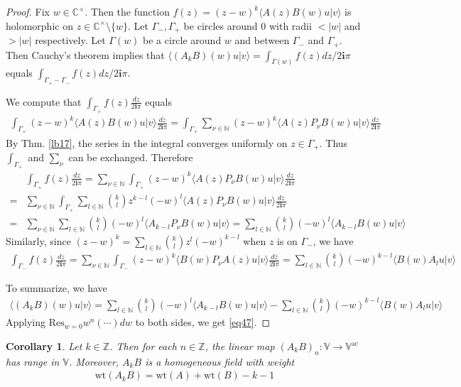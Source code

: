 \documentclass[12pt,b5paper,notitlepage]{article}
\theoremstyle{definition}
\theoremstyle{plain}
\newtheorem{co}[df]{Corollary}
\newcommand{\Res}{\mathrm{Res}}
\newcommand{\bk}[1]{\langle {#1}\rangle}
\newcommand{\im}{\mathbf{i}}
\newcommand{\Vbb}{\mathbb V}
\newcommand{\Cbb}{\mathbb C}
\newcommand{\Nbb}{\mathbb N}
\newcommand{\Zbb}{\mathbb Z}
\newcommand{\wt}{\mathrm{wt}}
\newcommand{\ac}{\mathrm{ac}}
\numberwithin{equation}{section}
\begin{document}
\begin{proof}
Fix $w\in\Cbb^\times$. Then the function $f(z)=(z-w)^k\bk{A(z)B(w)u|v}$ is holomorphic on $z\in\Cbb^\times\setminus\{w\}$. Let $\Gamma_-,\Gamma_+$ be circles around $0$ with radii $<|w|$ and $>|w|$ respectively. Let $\Gamma(w)$ be a circle around $w$ and between $\Gamma_-$ and $\Gamma_+$. Then Cauchy's theorem implies that $\bk{(A_kB)(w)u|v}=\int_{\Gamma(w)}f(z)dz/2\im\pi$ equals $\int_{\Gamma_+-\Gamma_-}f(z)dz/2\im\pi$.


We compute that $\int_{\Gamma_+}f(z)\frac{dz}{2\im\pi}$ equals
\begin{align*}
\int_{\Gamma_+}(z-w)^k\bk{A(z)B(w)u|v}\frac{dz}{2\im\pi}=\int_{\Gamma_+}\sum_{\nu\in\Nbb} (z-w)^k\bk{A(z)P_\nu B(w)u|v}\frac{dz}{2\im\pi}
\end{align*}
By Thm. \ref{lb17}, the series in the integral converges uniformly on $z\in\Gamma_+$. Thus $\int_{\Gamma_+}$ and $\sum_\nu$ can be exchanged. Therefore
\begin{align*}
&\int_{\Gamma_+}f(z)\frac{dz}{2\im\pi}=\sum_{\nu\in\Nbb}\int_{\Gamma_+} (z-w)^k\bk{A(z)P_\nu B(w)u|v}\frac{dz}{2\im\pi}\\
=&\sum_{\nu\in\Nbb}\int_{\Gamma_+}\sum_{l\in\Nbb}{k\choose l}z^{k-l}(-w)^l \bk{A(z)P_\nu B(w)u|v}\frac{dz}{2\im\pi}\\
=&\sum_{\nu\in\Nbb}\sum_{l\in\Nbb}{k\choose l}(-w)^l\bk{A_{k-l}P_\nu B(w)u|v}=\sum_{l\in\Nbb}{k\choose l}(-w)^l\bk{A_{k-l} B(w)u|v}
\end{align*}
Similarly, since $(z-w)^k=\sum_{l\in\Nbb}{k\choose l}z^l(-w)^{k-l}$ when $z$ is on $\Gamma_-$, we have
\begin{align*}
\int_{\Gamma_-}f(z)\frac{dz}{2\im\pi}=\sum_{\nu\in\Nbb}\int_{\Gamma_-} (z-w)^k\bk{B(w)P_\nu A(z) u|v}\frac{dz}{2\im\pi}=\sum_{l\in\Nbb}{k\choose l}(-w)^{k-l}\bk{B(w)A_lu|v}
\end{align*}

To summarize, we have
\begin{align*}
\bk{(A_kB)(w)u|v}=\sum_{l\in\Nbb}{k\choose l}(-w)^l\bk{A_{k-l} B(w)u|v}-\sum_{l\in\Nbb}{k\choose l}(-w)^{k-l}\bk{B(w)A_lu|v}
\end{align*}
Applying $\Res_{w=0}w^n(\cdots)dw$ to both sides, we get \eqref{eq47}.
\end{proof}


\begin{co}\label{lb26}
Let $k\in\Zbb$. Then for each $n\in\Zbb$, the linear map $(A_kB)_n:\Vbb\rightarrow\Vbb^\ac$ has range in $\Vbb$. Moreover, $A_kB$ is a homogeneous field with weight
\begin{align}\label{eq48}
\wt(A_kB)=\wt(A)+\wt(B)-k-1
\end{align}
\end{co}
\end{document}
